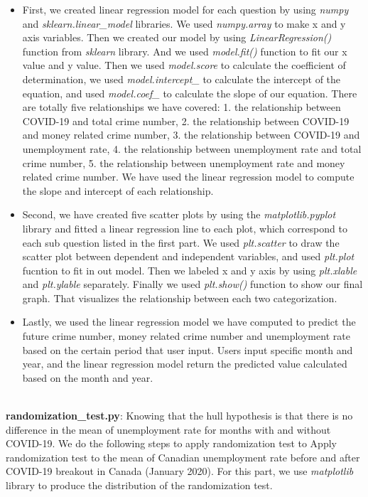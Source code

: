 \documentclass[fontsize=11pt]{article}
\begin{document}
\begin{itemize}
    \item First, we created linear regression model for each question by using \textsl{numpy} and \textsl{sklearn.linear\_model} libraries. We used \textit{numpy.array} to make x and y axis variables. Then we created our model by using \textit{LinearRegression()} function from \textsl{sklearn} library. And we used \textit{model.fit()} function to fit our x value and y value. Then we used \textit{model.score} to calculate the coefficient of determination, we used \textit{model.intercept\_} to calculate the intercept of the equation, and used \textit{model.coef\_} to calculate the slope of our equation. There are totally five relationships we have covered: 1. the relationship between COVID-19 and total crime number, 2. the relationship between COVID-19 and money related crime number, 3. the relationship between COVID-19 and unemployment rate, 4. the relationship between unemployment rate and total crime number, 5. the relationship between unemployment rate and money related crime number. We have used the linear regression model to compute the slope and intercept of each relationship.
    \item Second, we have created five scatter plots by using the \textsl{matplotlib.pyplot} library and fitted a linear regression line to each plot, which correspond to each sub question listed in the first part. We used \textit{plt.scatter} to draw the scatter plot between dependent and independent variables, and used \textit{plt.plot} fucntion to fit in out model. Then we labeled x and y axis by using \textit{plt.xlable} and \textit{plt.ylable} separately. Finally we used \textit{plt.show()} function to show our final graph. That visualizes the relationship between each two categorization.
    \item Lastly, we used the linear regression model we have computed to predict the future crime number, money related crime number and unemployment rate based on the certain period that user input. Users input specific month and year, and the linear regression model return the predicted value calculated based on the month and year.
\end{itemize}
\\
\textbf{randomization\_test.py}: Knowing that the hull hypothesis is that there is no difference in the mean of unemployment rate for months with and without COVID-19. We do the following steps to apply randomization test to Apply randomization test to the mean of Canadian unemployment rate before and after COVID-19 breakout in Canada (January 2020). For this part, we use \textsl{matplotlib} library to produce the distribution of the randomization test.
\end{document}
